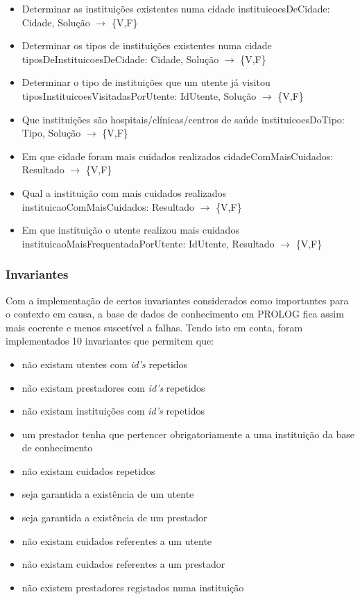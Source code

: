 \documentclass{article}
\begin{document}
\begin{itemize}
	\item Determinar as instituições existentes numa cidade
\newline
instituicoesDeCidade: Cidade, Solução $\to$ \{V,F\}
	\item Determinar os tipos de instituições existentes numa cidade
\newline
tiposDeInstituicoesDeCidade: Cidade, Solução $\to$ \{V,F\}
	\item Determinar o tipo de instituições que um utente já visitou
\newline
tiposInstituicoesVisitadasPorUtente: IdUtente, Solução $\to$ \{V,F\}
	\item Que instituições são hospitais/clínicas/centros de saúde
\newline
instituicoesDoTipo: Tipo, Solução $\to$ \{V,F\}
	\item Em que cidade foram mais cuidados realizados
\newline
cidadeComMaisCuidados: Resultado $\to$ \{V,F\}
    \item Qual a instituição com mais cuidados realizados
\newline
instituicaoComMaisCuidados: Resultado $\to$ \{V,F\}
    \item Em que instituição o utente realizou mais cuidados
\newline
instituicaoMaisFrequentadaPorUtente: IdUtente, Resultado $\to$ \{V,F\}
\end{itemize}

\subsubsection{Invariantes}

Com a implementação de certos invariantes considerados como importantes para o contexto em causa, a base de dados de conhecimento em PROLOG fica assim mais coerente e menos suscetível a falhas.
Tendo isto em conta, foram implementados 10 invariantes que permitem que:
\begin{itemize}
	\item não existam utentes com \textit{id's} repetidos
    \item não existam prestadores com \textit{id's} repetidos
    \item não existam instituições com \textit{id's} repetidos
    \item um prestador tenha que pertencer obrigatoriamente a uma instituição da base de conhecimento
    \item não existam cuidados repetidos
    \item seja garantida a existência de um utente
    \item seja garantida a existência de um prestador
    \item não existam cuidados referentes a um utente
    \item não existam cuidados referentes a um prestador
    \item não existem prestadores registados numa instituição
\end{itemize}
\end{document}
